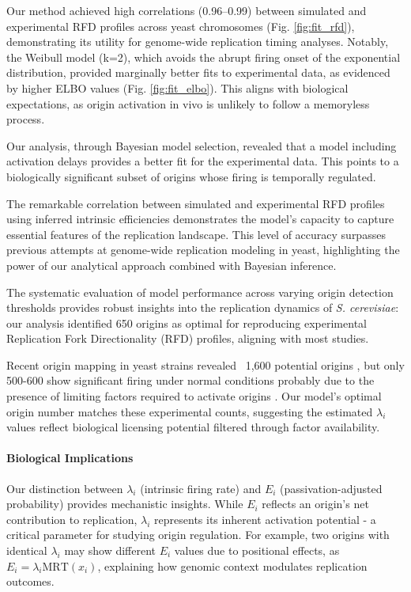 \documentclass[10pt,a4paper]{revtex4-2}
\begin{document}
Our method achieved high correlations (0.96–0.99) between simulated and experimental RFD profiles across yeast chromosomes (Fig. \ref{fig:fit_rfd}), demonstrating its utility for genome-wide replication timing analyses. Notably, the Weibull model (k=2), which avoids the abrupt firing onset of the exponential distribution, provided marginally better fits to experimental data, as evidenced by higher ELBO values (Fig. \ref{fig:fit_elbo}). This aligns with biological expectations, as origin activation in vivo is unlikely to follow a memoryless process.

Our analysis, through Bayesian model selection, revealed that a model including activation delays provides a better fit for the experimental data. This points to a biologically significant subset of origins whose firing is temporally regulated.

The remarkable correlation between simulated and experimental RFD profiles using inferred intrinsic 
efficiencies demonstrates the model's capacity to capture essential features of the replication landscape. 
This level of accuracy surpasses previous attempts at genome-wide replication modeling in yeast, 
highlighting the power of our analytical approach combined with Bayesian inference. 

The systematic evaluation of model performance across varying origin detection thresholds provides 
robust insights into the replication dynamics of \textit{S. cerevisiae}: our analysis identified 650 
origins as optimal for reproducing experimental Replication Fork Directionality (RFD) profiles, aligning with most studies.

Recent origin mapping in yeast strains revealed ~1,600 potential origins \cite{Foss2024}, but only 500-600 show significant firing under normal conditions \cite{Hennion2020} probably due to the presence of limiting factors required to activate origins \cite{Mantiero2011}. Our model's optimal origin number matches these experimental counts, suggesting the estimated $\lambda_i$ values reflect biological licensing potential filtered through factor availability.

\paragraph{Biological Implications}

Our distinction between $\lambda_i$ (intrinsic firing rate) and $E_i$ (passivation-adjusted probability) provides mechanistic insights. 
While $E_i$ reflects an origin's net contribution to replication, $\lambda_i$ represents its inherent activation potential - 
a critical parameter for studying origin regulation. For example, 
two origins with identical $\lambda_i$ may show different $E_i$ values due to positional effects, as $E_i = \lambda_i \text{MRT}(x_i)$, 
explaining how genomic context modulates replication outcomes.
\end{document}

